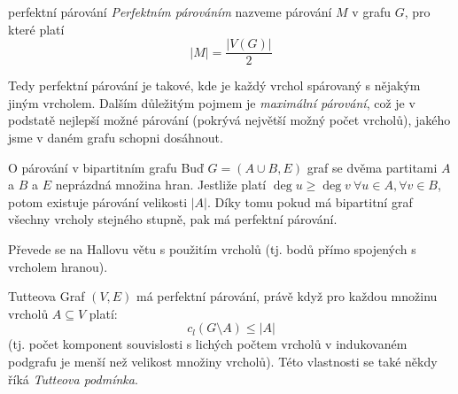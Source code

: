 \begin{definiceN}{perfektní párování}
\emph{Perfektním párováním} nazveme párování $M$ v grafu $G$, pro které platí $$|M| = \frac{|V(G)|}{2}$$

\noindent
Tedy perfektní párování je takové, kde je každý vrchol spárovaný s nějakým jiným vrcholem. Dalším důležitým pojmem je \emph{maximální párování}, což je v podstatě nejlepší možné párování (pokrývá největší možný počet vrcholů), jakého jsme v daném grafu schopni dosáhnout.
\end{definiceN}


\begin{vetaN}{O párování v bipartitním grafu}
Buď $G=(A\cup B,E)$ graf se dvěma partitami $A$ a $B$ a $E$ neprázdná množina hran. Jestliže platí $\deg u \geq \deg v\ \forall u\in A,\forall v\in B$, potom existuje párování velikosti $|A|$. Díky tomu pokud má bipartitní graf všechny vrcholy stejného stupně, pak má perfektní párování.

\begin{dukaz}
Převede se na Hallovu větu s použitím  vrcholů (tj. bodů přímo spojených s vrcholem hranou).
\end{dukaz}
\end{vetaN}

\begin{vetaN}{Tutteova}
Graf $(V,E)$ má perfektní párování, právě když pro každou množinu vrcholů $A\subseteq V$ platí:
$$c_l(G\setminus A)\leq |A|$$
(tj. počet komponent souvislosti s lichých počtem vrcholů v indukovaném podgrafu je menší než velikost množiny vrcholů). Této vlastnosti se také někdy říká \emph{Tutteova podmínka}.
\end{vetaN}

